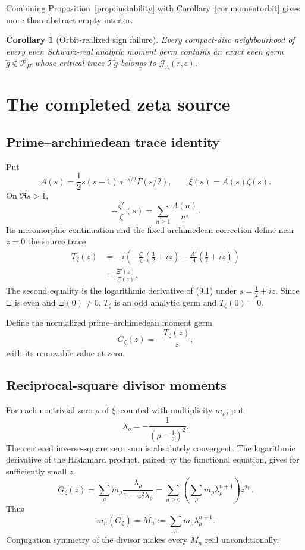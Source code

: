 \documentclass[11pt]{article}
\newtheorem{corollary}[theorem]{Corollary}
\newcommand{\cG}{\mathcal G}
\newcommand{\cP}{\mathcal P}
\newcommand{\cT}{\mathcal T}
\begin{document}
Combining Proposition~\ref{prop:instability} with
Corollary~\ref{cor:momentorbit} gives more than abstract empty interior.

\begin{corollary}[Orbit-realized sign failure]\label{cor:orbitfailure}
Every compact-disc neighbourhood of every even Schwarz-real analytic moment germ
contains an exact even germ \(\widetilde g\notin\cP_H\) whose critical trace
\(\cT\widetilde g\) belongs to
\(\overline{\cG_\Lambda(r,\epsilon)}\).
\end{corollary}

\section{The completed zeta source}

\subsection{Prime--archimedean trace identity}

Put
\[
 A(s)=\frac12s(s-1)\pi^{-s/2}\Gamma(s/2),
 \qquad \xi(s)=A(s)\zeta(s).
\tag{9.1}
\]
On \(\Re s>1\),
\[
 -\frac{\zeta'}{\zeta}(s)
 =\sum_{n\geq1}\frac{\Lambda(n)}{n^s}.
\tag{9.2}
\]
Its meromorphic continuation and the fixed archimedean correction define near
\(z=0\) the source trace
\[
\begin{aligned}
 T_\zeta(z)
 &=-i\left(
   -\frac{\zeta'}{\zeta}\!\left(\frac12+iz\right)
   -\frac{A'}{A}\!\left(\frac12+iz\right)\right)\\
 &=\frac{\Xi'(z)}{\Xi(z)}.
\end{aligned}
\tag{9.3}
\]
The second equality is the logarithmic derivative of (9.1) under
\(s=\frac12+iz\).  Since \(\Xi\) is even and \(\Xi(0)\neq0\), \(T_\zeta\) is an
odd analytic germ and \(T_\zeta(0)=0\).

Define the normalized prime--archimedean moment germ
\[
 G_\zeta(z)=-\frac{T_\zeta(z)}{z},
\tag{9.4}
\]
with its removable value at zero.

\subsection{Reciprocal-square divisor moments}

For each nontrivial zero \(\rho\) of \(\xi\), counted with multiplicity \(m_\rho\),
put
\[
 \lambda_\rho=-\frac{1}{(\rho-\frac12)^2}.
\tag{9.5}
\]
The centered inverse-square zero sum is absolutely convergent.  The logarithmic
derivative of the Hadamard product, paired by the functional equation, gives for
sufficiently small \(z\) \cite[Chapter~2]{Titchmarsh1986}
\[
 G_\zeta(z)
 =\sum_\rho m_\rho\frac{\lambda_\rho}{1-z^2\lambda_\rho}
 =\sum_{n\geq0}
   \left(\sum_\rho m_\rho\lambda_\rho^{n+1}\right)z^{2n}.
\tag{9.6}
\]
Thus
\[
 m_n(G_\zeta)=M_n
 :=\sum_\rho m_\rho\lambda_\rho^{n+1}.
\tag{9.7}
\]
Conjugation symmetry of the divisor makes every \(M_n\) real unconditionally.
\end{document}
